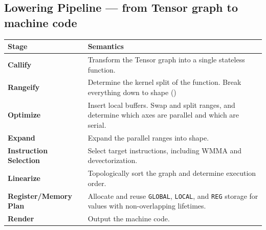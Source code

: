 \documentclass[10pt,letterpaper]{article}
\begin{document}
\subsection*{Lowering Pipeline \normalfont\small--- from Tensor graph to machine code}

\begin{tabular}{@{}l p{9.7cm}@{}}
\toprule
\textbf{Stage} & \textbf{Semantics} \\
\midrule
\textbf{Callify} & Transform the Tensor graph into a single stateless function. \\
\textbf{Rangeify} & Determine the kernel split of the function. Break everything down to shape () \\
\textbf{Optimize} & Insert local buffers. Swap and split ranges, and determine which axes are parallel and which are serial. \\
\textbf{Expand} & Expand the parallel ranges into shape. \\
\textbf{Instruction Selection} & Select target instructions, including WMMA and devectorization. \\
\textbf{Linearize} & Topologically sort the graph and determine execution order. \\
\textbf{Register/Memory Plan} & Allocate and reuse \texttt{GLOBAL}, \texttt{LOCAL}, and \texttt{REG} storage for values with non-overlapping lifetimes. \\
\textbf{Render} & Output the machine code. \\
\bottomrule
\end{tabular}
\end{document}
